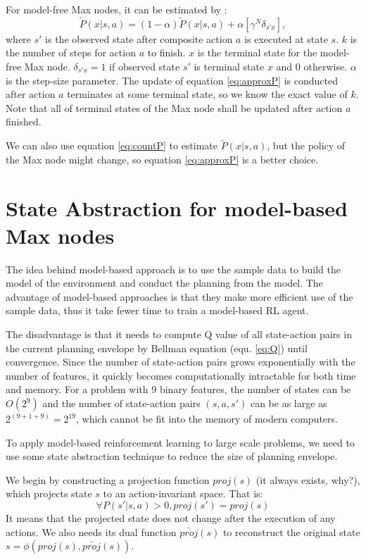 For model-free Max nodes, it can be estimated by \cite{option}:
\begin{equation}
    \tilde{P}(x|s, a) = (1-\alpha)\tilde{P}(x|s, a) + \alpha [ \gamma^N \delta_{s'x}],
    \label{eq:approxP}
\end{equation}
where $s'$ is the observed state after composite action $a$ is executed at state $s$.
$k$ is the number of steps for action $a$ to finish. 
$x$ is the terminal state for the model-free Max node. $\delta_{s'x}=1$ if observed state $s'$
is terminal state $x$ and 0 otherwise.
$\alpha$ is the step-size parameter.
The update of equation \ref{eq:approxP} is conducted after action $a$ terminates at some terminal state,
so we know the exact value of $k$. Note that all of terminal states of the Max node shall be updated after 
action $a$ finished.

We can also use equation \ref{eq:countP} to estimate $\tilde{P}(x|s, a)$, but the policy of the Max node
might change, so equation \ref{eq:approxP} is a better choice.

\section{State Abstraction for model-based Max nodes}
The idea behind model-based approach is to use the sample data to build the model of the environment
and conduct the planning from the model.
The advantage of model-based approaches is that they make more efficient use of the sample data, thus 
it take fewer time to train a model-based RL agent.

The disadvantage is that it needs to compute Q value of all state-action pairs in the current 
planning envelope by Bellman equation (equ. \ref{eq:Q}) until convergence.
Since the number of state-action pairs grows exponentially with the number of features,
it quickly becomes computationally intractable for both time and memory.
For a problem with 9 binary features, the number of states can be $O(2^9)$ and the
number of state-action pairs $(s, a, s')$ can be as large as $2^(9+1+9)=2^19$, which cannot be fit into the
memory of modern computers.

To apply model-based reinforcement learning to large scale problems, 
we need to use some state abstraction technique to reduce the size of planning envelope.

We begin by constructing a projection function $proj(s)$ (it always exists, why?),
which projects state $s$ to an action-invariant space.
That is:
\begin{equation}
    \forall P(s'|s, a) > 0, proj(s') = proj(s)
\end{equation}
It means that the projected state does not change after the execution of 
any actions.
We also needs its dual function $\bar{proj}(s)$ to reconstruct 
the original state $s = \phi(proj(s), \bar{proj}(s))$.

